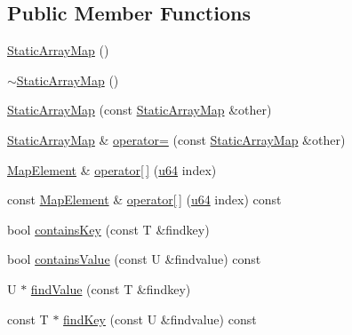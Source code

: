 \subsection*{Public Member Functions}
\begin{DoxyCompactItemize}
\item 
\hyperlink{classcrap_1_1container_1_1_static_array_map_af4af55ced8d19d766deed3a79193da62}{Static\-Array\-Map} ()
\item 
\hyperlink{classcrap_1_1container_1_1_static_array_map_a1645fe5d6d8e8a96c8a90e84f2a6a784}{$\sim$\-Static\-Array\-Map} ()
\item 
\hyperlink{classcrap_1_1container_1_1_static_array_map_a133e3da3562383a39920e1ca13bee0e6}{Static\-Array\-Map} (const \hyperlink{classcrap_1_1container_1_1_static_array_map}{Static\-Array\-Map} \&other)
\item 
\hyperlink{classcrap_1_1container_1_1_static_array_map}{Static\-Array\-Map} \& \hyperlink{classcrap_1_1container_1_1_static_array_map_a2597ec1783ff9a2e6f5b715f5027c841}{operator=} (const \hyperlink{classcrap_1_1container_1_1_static_array_map}{Static\-Array\-Map} \&other)
\item 
\hyperlink{classcrap_1_1container_1_1_static_array_map_aef770c84a2c91625ee6c423672a1f21c}{Map\-Element} \& \hyperlink{classcrap_1_1container_1_1_static_array_map_a3026b3e02fd10481bcde416fcd714ec9}{operator\mbox{[}$\,$\mbox{]}} (\hyperlink{types_8h_a3f7e2bcbb0b4c338f3c4f6c937cd4234}{u64} index)
\item 
const \hyperlink{classcrap_1_1container_1_1_static_array_map_aef770c84a2c91625ee6c423672a1f21c}{Map\-Element} \& \hyperlink{classcrap_1_1container_1_1_static_array_map_a57829a95edc4a53be78d1e26661326f4}{operator\mbox{[}$\,$\mbox{]}} (\hyperlink{types_8h_a3f7e2bcbb0b4c338f3c4f6c937cd4234}{u64} index) const 
\item 
bool \hyperlink{classcrap_1_1container_1_1_static_array_map_ab36fe495a862ce0fd32edb9e544bbd30}{contains\-Key} (const T \&findkey)
\item 
bool \hyperlink{classcrap_1_1container_1_1_static_array_map_a799c426e467df63e9ee0e4dec8506234}{contains\-Value} (const U \&findvalue) const 
\item 
U $\ast$ \hyperlink{classcrap_1_1container_1_1_static_array_map_af2712e025a37b9847a4f75649fdbd420}{find\-Value} (const T \&findkey)
\item 
const T $\ast$ \hyperlink{classcrap_1_1container_1_1_static_array_map_ab6b260ff6bd4fd0e212384bf3259de75}{find\-Key} (const U \&findvalue) const 
\item 

\end{DoxyCompactItemize}
